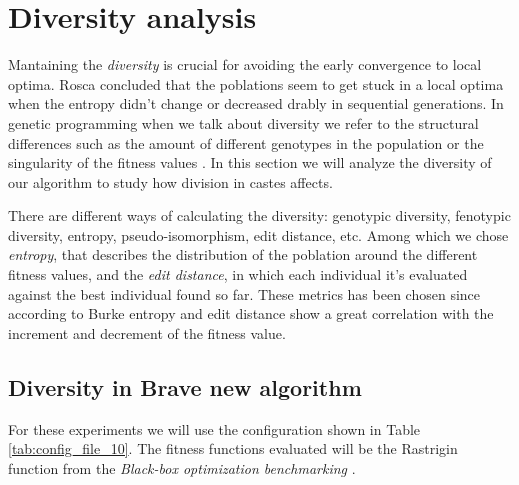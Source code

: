 \section{Diversity analysis}


Mantaining the \emph{diversity} is crucial for avoiding the early convergence to local optima. Rosca \cite{Rosca} concluded that 
the poblations seem to get stuck in a local optima when the entropy didn't change or decreased drably in sequential generations.
In genetic programming when we talk about diversity we refer to the structural differences such as the amount of different
genotypes in the population or the singularity of the fitness values \cite{genetic}. In this section we will analyze the diversity of our
algorithm to study how division in castes affects.

There are different ways of calculating the diversity: genotypic diversity, fenotypic diversity, entropy, pseudo-isomorphism, edit distance, etc.
Among which we chose \textit{entropy}, that describes the distribution of the poblation around the different fitness values, and the \textit{edit distance},
in which each individual it's evaluated against the best individual found so far. These metrics has been chosen since according to Burke \cite{diversity} entropy
and edit distance show a great correlation with the increment and decrement of the fitness value.

\subsection{Diversity in Brave new algorithm}

For these experiments we will use the configuration shown in Table \ref{tab:config_file_10}. The fitness functions evaluated will be the Rastrigin
function from the \emph{Black-box optimization benchmarking} \cite{BBOB}.

